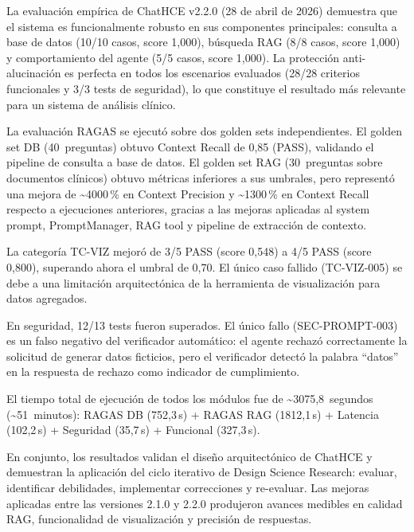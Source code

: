 \documentclass[11pt,a4paper,twocolumn]{article}
\begin{document}
La evaluaci\'{o}n emp\'{i}rica de ChatHCE v2.2.0 (28 de abril de 2026) demuestra que el sistema es funcionalmente robusto en sus componentes principales: consulta a base de datos (10/10 casos, score 1,000), b\'{u}squeda RAG (8/8 casos, score 1,000) y comportamiento del agente (5/5 casos, score 1,000). La protecci\'{o}n anti-alucinaci\'{o}n es perfecta en todos los escenarios evaluados (28/28 criterios funcionales y 3/3 tests de seguridad), lo que constituye el resultado m\'{a}s relevante para un sistema de an\'{a}lisis cl\'{i}nico.

La evaluaci\'{o}n RAGAS se ejecut\'{o} sobre dos golden sets independientes. El golden set DB (40~preguntas) obtuvo Context Recall de 0,85 (PASS), validando el pipeline de consulta a base de datos. El golden set RAG (30~preguntas sobre documentos cl\'{i}nicos) obtuvo m\'{e}tricas inferiores a sus umbrales, pero represent\'{o} una mejora de \textasciitilde4000\,\% en Context Precision y \textasciitilde1300\,\% en Context Recall respecto a ejecuciones anteriores, gracias a las mejoras aplicadas al system prompt, PromptManager, RAG tool y pipeline de extracci\'{o}n de contexto.

La categor\'{i}a TC-VIZ mejor\'{o} de 3/5 PASS (score 0,548) a 4/5 PASS (score 0,800), superando ahora el umbral de 0,70. El \'{u}nico caso fallido (TC-VIZ-005) se debe a una limitaci\'{o}n arquitect\'{o}nica de la herramienta de visualizaci\'{o}n para datos agregados.

En seguridad, 12/13 tests fueron superados. El \'{u}nico fallo (SEC-PROMPT-003) es un falso negativo del verificador autom\'{a}tico: el agente rechaz\'{o} correctamente la solicitud de generar datos ficticios, pero el verificador detect\'{o} la palabra ``datos'' en la respuesta de rechazo como indicador de cumplimiento.

El tiempo total de ejecuci\'{o}n de todos los m\'{o}dulos fue de \textasciitilde3075,8~segundos (\textasciitilde51~minutos): RAGAS DB (752,3\,s) + RAGAS RAG (1812,1\,s) + Latencia (102,2\,s) + Seguridad (35,7\,s) + Funcional (327,3\,s).

En conjunto, los resultados validan el dise\~{n}o arquitect\'{o}nico de ChatHCE y demuestran la aplicaci\'{o}n del ciclo iterativo de Design Science Research: evaluar, identificar debilidades, implementar correcciones y re-evaluar. Las mejoras aplicadas entre las versiones 2.1.0 y 2.2.0 produjeron avances medibles en calidad RAG, funcionalidad de visualizaci\'{o}n y precisi\'{o}n de respuestas.
\end{document}
